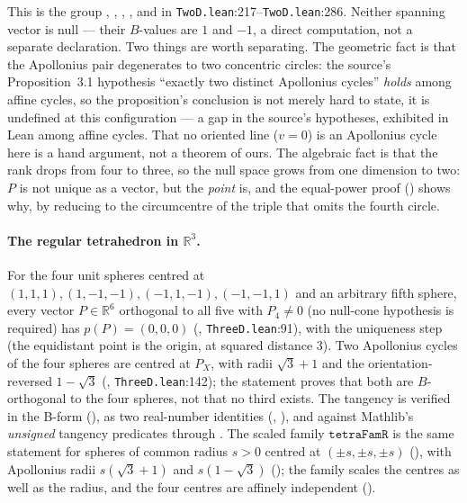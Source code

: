 \documentclass[11pt]{article}
\theoremstyle{definition}
\theoremstyle{remark}
\newcommand{\src}[3]{\texttt{#2}:#3}
\newcommand{\RR}{\mathbb{R}}
\begin{document}
This is the group , ,
, ,
 and  in
\src{PaperK}{TwoD.lean}{217}--\src{PaperK}{TwoD.lean}{286}. Neither spanning vector is null --- their
$B$-values are $1$ and $-1$, a direct computation, not a separate declaration. Two things are worth
separating. The
geometric fact is that the Apollonius pair degenerates to two concentric circles: the source's
Proposition~3.1 hypothesis ``exactly two distinct Apollonius cycles'' \emph{holds} among affine
cycles, so the proposition's conclusion is not merely hard to state, it is undefined at this
configuration --- a gap in the source's hypotheses, exhibited in Lean among affine cycles. That no
oriented line ($v=0$) is an Apollonius cycle here is a hand argument, not a theorem of ours. The algebraic fact is that the
rank drops from four to three, so the null space grows from one dimension to two: $P$ is not unique
as a vector, but the \emph{point} is,
and the equal-power proof () shows why, by reducing to the
circumcentre of the triple that omits the fourth circle.

\paragraph{The regular tetrahedron in $\RR^3$.} For the four unit spheres centred at
$(1,1,1),(1,-1,-1),(-1,1,-1),(-1,-1,1)$ and an arbitrary fifth sphere, every vector $P\in\RR^6$
orthogonal to all five with $P_4\neq0$ (no null-cone hypothesis is required) has $p(P)=(0,0,0)$ (,
\src{PaperK}{ThreeD.lean}{91}), with the uniqueness step 
(the equidistant point is the origin, at squared distance $3$). Two Apollonius cycles of the four
spheres are centred at $P_X$, with radii $\sqrt3+1$ and the orientation-reversed $1-\sqrt3$
(, \src{PaperK}{ThreeD.lean}{142}); the statement proves that
both are $B$-orthogonal to the four spheres, not that no third exists. The tangency is verified in the
B-form (), as two real-number identities
(, ), and against Mathlib's
\emph{unsigned} tangency predicates through . The scaled family
$\texttt{tetraFamR}$ is the same statement for spheres of common radius $s>0$ centred at
$(\pm s,\pm s,\pm s)$ (), with Apollonius radii
$s(\sqrt3+1)$ and $s(1-\sqrt3)$ (); the family scales the centres as
well as the radius, and the four centres are affinely independent
().
\end{document}

